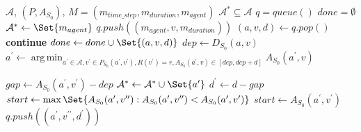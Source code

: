 \documentclass{article}
\DeclareMathOperator*{\argmin}{arg\,min}
\begin{document}
\begin{algorithm}
	\caption{$changed\_transmission\_chains$} \label{algo:transmission_chains}
	\begin{algorithmic}[1]
		\Require $\mathcal{A}$, $(P,A_{S_0})$, $M=(m_{time\_step},m_{duration},m_{agent})$
	    \Ensure $\mathcal{A}^* \subseteq \mathcal{A}$
	    \State $q = queue()$
	    \State $done = \emptyset$
	    \State $\mathcal{A}^* \leftarrow \Set{m_{agent}}$
	        \State $q.push((m_{agent},v,m_{duration}))$
	    \EndFor
            \State $(a,v,d) \leftarrow q.pop()$
                \State \textbf{continue}
            \EndIf
            \State $done \leftarrow done \cup \Set{(a,v,d)}$
            \State $dep \leftarrow D_{S_0}(a,v)$
            \State $a^\prime \leftarrow \argmin_{a^\prime \in \mathcal{A}, v^\prime \in P_{S_0}(a^\prime, v^\prime), R(v^\prime)=r, A_{S_0}(a^\prime,v)\in [dep,dep+d]} A_{S_0}(a^\prime,v)$

                \State $gap \leftarrow  A_{S_0}(a^\prime,v^\prime)- dep$
                    \State $\mathcal{A}^* \leftarrow \mathcal{A}^* \cup \Set{a^\prime}$
                    \State $d^\prime \leftarrow d-gap$
                    \State $start \leftarrow \max\Set{A_{S_0}(a^\prime,v^{\prime\prime}):A_{S_0}(a^\prime,v^{\prime\prime}) < A_{S_0}(a^\prime,v^\prime)}$
                        \State $start \leftarrow A_{S_0}(a^\prime,v^{\prime})$
                    \EndIf
        	            \State $q.push((a^\prime,v^{\prime\prime},d^\prime))$
        	        \EndFor
    	        \EndIf
            \EndIf{}

	    \EndWhile

	\end{algorithmic}
\end{algorithm}
\end{document}
